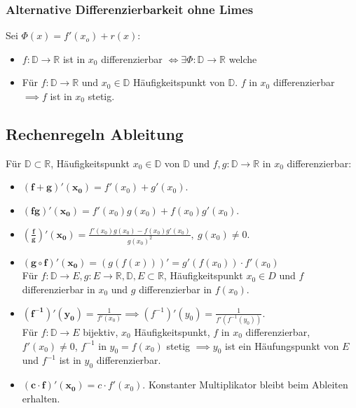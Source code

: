 \documentclass[a4paper]{article}
\newcommand\R{\ensuremath{\mathbb{R}}}
\begin{document}
\subsubsection{Alternative Differenzierbarkeit ohne Limes}
Sei $\Phi(x) = f'(x_o) + r(x)$:
\begin{itemize}[leftmargin=4.5mm, topsep=1pt, parsep=1pt]
    \item $f: \mathbb{D} \to \R$ ist in $x_0$ differenzierbar $\iff \exists \Phi: \mathbb{D} \to \R$ welche
\end{itemize}
\begin{itemize}[leftmargin=4.5mm, topsep=1pt, parsep=1pt]
    \item Für $f: \mathbb{D} \to \R$ und $x_0 \in \mathbb{D}$ Häufigkeitspunkt von $\mathbb{D}$. $f$ in $x_0$ differenzierbar $\implies f$ ist in $x_0$ stetig.
\end{itemize}

\subsection{Rechenregeln Ableitung}
Für $\mathbb{D} \subset \R$, Häufigkeitspunkt $x_0 \in \mathbb{D}$ von $\mathbb{D}$ und $f,g: \mathbb{D} \to \R$ in $x_0$ differenzierbar:
\begin{itemize}[leftmargin=4.5mm, topsep=1pt, parsep=1pt]
    \item $\mathbf{(f + g)'(x_0)} = f'(x_0) + g'(x_0)$.
    \item $\mathbf{(fg)'(x_0)} = f'(x_0)g(x_0) + f(x_0)g'(x_0)$.
    \item $\mathbf{\left( \frac{f}{g} \right)' (x_0)} = \frac{f'(x_0)g(x_0) - f(x_0)g'(x_0)}{g(x_0)^2}, \ g(x_0) \neq 0$.
    \item $\mathbf{(g \circ f)'(x_0)} = (g(f(x)))' = g'(f(x_0)) \cdot f'(x_0)$ \\  
            Für $f: \mathbb{D} \to E, g: E \to \R, \mathbb{D}, E \subset \R$, Häufigkeitspunkt $x_0 \in D$ und $f$ differenzierbar in $x_0$ und $g$ differenzierbar in $f(x_0)$.
    \item $\mathbf{(f^{-1})'(y_0)} = \frac{1}{f'(x_0)} \implies (f^{-1})'(y_0) = \frac{1}{f'(f^{-1}(y_0))}$. \\
          Für $f:\mathbb{D} \to E$ bijektiv, $x_0$ Häufigkeitspunkt, $f$ in $x_0$ differenzierbar, $f'(x_0) \neq 0$, $f^{-1}$ in $y_0 = f(x_0)$ stetig $\implies y_0$ ist ein Häufungspunkt von $E$ und $f^{-1}$ ist in $y_0$ differenzierbar.
    \item $\mathbf{(c \cdot f)'(x_0)} = c \cdot f'(x_0)$.
        \tiny \color{gray}
          Konstanter Multiplikator bleibt beim Ableiten erhalten. 
        \color{black} \normalsize
\end{itemize}
\end{document}
